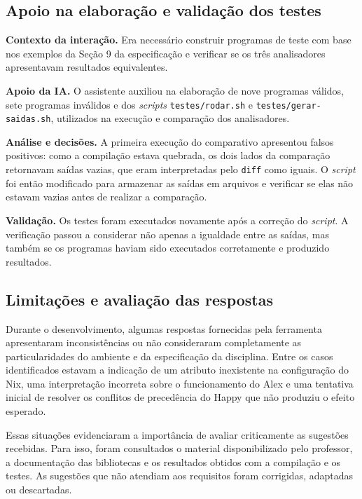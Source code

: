 \subsection{Apoio na elaboração e validação dos testes}

\textbf{Contexto da interação.} Era necessário construir
programas de teste com base nos exemplos da Seção 9 da
especificação e verificar se os três analisadores
apresentavam resultados equivalentes.

\textbf{Apoio da IA.} O assistente auxiliou na elaboração
de nove programas válidos, sete programas inválidos e
dos \emph{scripts} \texttt{testes/rodar.sh} e
\texttt{testes/gerar-saidas.sh}, utilizados na execução
e comparação dos analisadores.

\textbf{Análise e decisões.} A primeira execução do
comparativo apresentou falsos positivos: como a compilação
estava quebrada, os dois lados da comparação retornavam
saídas vazias, que eram interpretadas pelo \texttt{diff}
como iguais. O \emph{script} foi então modificado para
armazenar as saídas em arquivos e verificar se elas
não estavam vazias antes de realizar a comparação.

\textbf{Validação.} Os testes foram executados novamente
após a correção do \emph{script}. A verificação passou
a considerar não apenas a igualdade entre as saídas,
mas também se os programas haviam sido executados
corretamente e produzido resultados.

\subsection{Limitações e avaliação das respostas}

Durante o desenvolvimento, algumas respostas fornecidas
pela ferramenta apresentaram inconsistências ou não
consideraram completamente as particularidades do ambiente
e da especificação da disciplina. Entre os casos
identificados estavam a indicação de um atributo
inexistente na configuração do Nix, uma interpretação
incorreta sobre o funcionamento do Alex e uma tentativa
inicial de resolver os conflitos de precedência do Happy
que não produziu o efeito esperado.

Essas situações evidenciaram a importância de avaliar
criticamente as sugestões recebidas. Para isso, foram
consultados o material disponibilizado pelo professor,
a documentação das bibliotecas e os resultados obtidos
com a compilação e os testes. As sugestões que não
atendiam aos requisitos foram corrigidas, adaptadas
ou descartadas.

